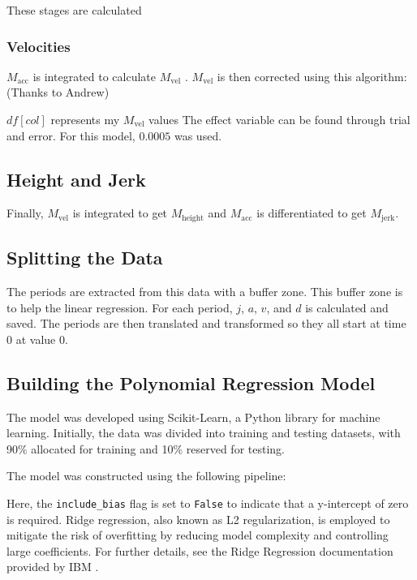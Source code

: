 \documentclass[12pt,a4paper]{article}
\begin{document}
These stages are calculated

\subsubsection{Velocities}
$M_{\text{acc}}$  is integrated to calculate $M_{\text{vel}}$ .  $M_{\text{vel}}$ is then corrected using this algorithm: (Thanks to Andrew)



$df[col]$ represents my $M_{\text{vel}}$ values
The effect variable can be found through trial and error. For this model, $0.0005$ was used.

\subsection{Height and Jerk}
Finally, $M_{\text{vel}}$ is integrated to get $M_{\text{height}}$ and $M_{\text{acc}}$ is differentiated to get $M_{\text{jerk}}$.

\subsection{Splitting the Data}
The periods are extracted from this data with a buffer zone. This buffer zone is to help the linear regression. For each period, $j$, $a$, $v$, and $d$ is calculated and saved. The periods are then translated and transformed so they all start at time 0 at value 0. 

\subsection{Building the Polynomial Regression Model}
The model was developed using Scikit-Learn, a Python library for machine learning. Initially, the data was divided into training and testing datasets, with 90\% allocated for training and 10\% reserved for testing.

The model was constructed using the following pipeline:



Here, the \verb|include_bias| flag is set to \verb|False| to indicate that a y-intercept of zero is required. Ridge regression, also known as L2 regularization, is employed to mitigate the risk of overfitting by reducing model complexity and controlling large coefficients. For further details, see the Ridge Regression documentation provided by IBM \cite{ibm_ridge_regression}.
\end{document}
